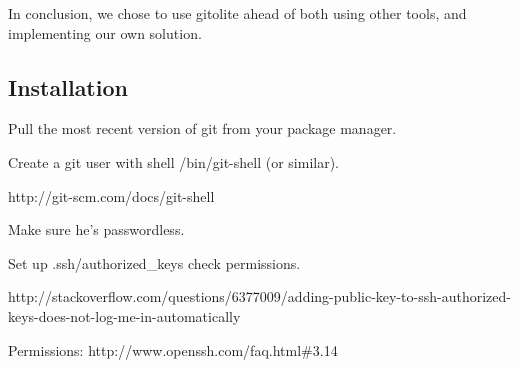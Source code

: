 In conclusion, we chose to use gitolite ahead of both using other tools, and
implementing our own solution.

\subsection{Installation}

Pull the most recent version of git from your package manager.

Create a git user with shell /bin/git-shell (or similar).

http://git-scm.com/docs/git-shell

Make sure he's passwordless.

Set up .ssh/authorized\_keys check permissions.

http://stackoverflow.com/questions/6377009/adding-public-key-to-ssh-authorized-keys-does-not-log-me-in-automatically

Permissions: http://www.openssh.com/faq.html\#3.14


